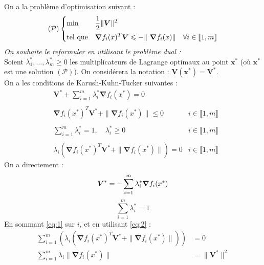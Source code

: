 \documentclass[french,12pt]{article}
\begin{document}
\noindent On a la problème d'optimisation suivant :
\begin{align*}
    (\mathcal{P})
    \begin{dcases}
        \min&\frac{1}{2}\|\boldsymbol{V}\|^2\\
        \text{tel que} &\boldsymbol{\nabla} f_i(x)^T\boldsymbol{V}\leqslant -\|\ \boldsymbol{\nabla} f_i(x)\| \quad\forall i\in\llbracket1,m\rrbracket
    \end{dcases}
\end{align*}
\textit{On souhaite le reformuler en utilisant le problème dual :}\\
Soient $\lambda_1^*,\ldots,\lambda_m^*\geqslant0$ les multiplicateurs de Lagrange optimaux au point $\boldsymbol{x}^*$ (où $\boldsymbol{x}^*$ est une solution $\left(\mathcal{P}\right)$). On considérera la notation : $\boldsymbol{V}(\boldsymbol{x}^*)=\boldsymbol{V}^*$.\\
On a les conditions de Karush-Kuhn-Tucker suivantes :
\begin{align}
    &\boldsymbol{V}^*+\sum_{i=1}^m\lambda_i^*\boldsymbol{\nabla} f_i(x^*)=0\nonumber\\\nonumber\\
    &\boldsymbol{\nabla} f_i(x^*)^T\boldsymbol{V}^*+\|\boldsymbol{\nabla} f_i(x^*)\|\leqslant0&i\in\llbracket1,m\rrbracket\nonumber\\\nonumber\\
    &\sum_{i=1}^m\lambda^*_i=1,\quad \lambda_i^*\geqslant0&i\in\llbracket1,m\rrbracket\nonumber\\\nonumber\\
    &\lambda_i\left(\boldsymbol{\nabla} f_i(x^*)^T\boldsymbol{V}^*+\|\boldsymbol{\nabla} f_i(x^*)\|\right)=0&i\in\llbracket1,m\rrbracket\label{eq:1}
\end{align}
On a directement :
\begin{equation}
    \label{eq:2}
    \boldsymbol{V}^*=-\sum_{i=1}^m\lambda_i^*\boldsymbol{\nabla} f_i(x^*)\\
\end{equation}
\begin{equation*}
    \sum_{i=1}^m\lambda^*_i=1
\end{equation*}
En sommant \eqref{eq:1} sur $i$, et en utilisant \eqref{eq:2} :
\begin{align*}
    \sum_{i=1}^m\left(\lambda_i\left(\boldsymbol{\nabla} f_i(x^*)^T\boldsymbol{V}^*+\|\boldsymbol{\nabla} f_i(x^*)\|\right)\right)&=0\\
     \sum_{i=1}^m\lambda_i\|\boldsymbol{\nabla} f_i(x^*)\|&=\|\boldsymbol{V}^*\|^2
\end{align*}
\end{document}
